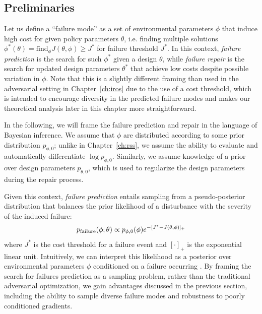 \subsection{Preliminaries}

Let us define a ``failure mode'' as a set of environmental parameters $\phi$ that induce high cost for given policy parameters $\theta$, i.e. finding multiple solutions $\phi^*(\theta) = \text{find}_\phi J(\theta, \phi) \geq J^*$ for failure threshold $J^*$. In this context, \textit{failure prediction} is the search for such $\phi^*$ given a design $\theta$, while \textit{failure repair} is the search for updated design parameters $\theta^*$ that achieve low costs despite possible variation in $\phi$. Note that this is a slightly different framing than used in the adversarial setting in Chapter~\ref{ch:iros} due to the use of a cost threshold, which is intended to encourage diversity in the predicted failure modes and makes our theoretical analysis later in this chapter more straightforward.

In the following, we will frame the failure prediction and repair in the language of Bayesian inference. We assume that $\phi$ are distributed according to some prior distribution $p_{\phi, 0}$; unlike in Chapter~\ref{ch:rss}, we assume the ability to evaluate and automatically differentiate $\log p_{\phi, 0}$. Similarly, we assume knowledge of a prior over design parameters $p_{\theta, 0}$, which is used to regularize the design parameters during the repair process.

Given this context, \textit{failure prediction} entails sampling from a pseudo-posterior distribution that balances the prior likelihood of a disturbance with the severity of the induced failure:
%
\begin{equation}
    p_{\rm{failure}}(\phi; \theta) \propto p_{\phi, 0}(\phi)e^{-[J^* - J(\theta, \phi)]_+} \label{ch:corl:eq:failure_logprob_basic}
\end{equation}
%
where $J^*$ is the cost threshold for a failure event and $[\cdot]_+$ is the exponential linear unit. Intuitively, we can interpret this likelihood as a posterior over environmental parameters $\phi$ conditioned on a failure occurring \cite{sinhaNeuralBridgeSampling2020,zhouRoCUSRobotController2021,maSamplingCanBe2019,dawsonBayesianApproachBreaking2023}. By framing the search for failures prediction as a sampling problem, rather than the traditional adversarial optimization, we gain advantages discussed in the previous section, including the ability to sample diverse failure modes and robustness to poorly conditioned gradients.

